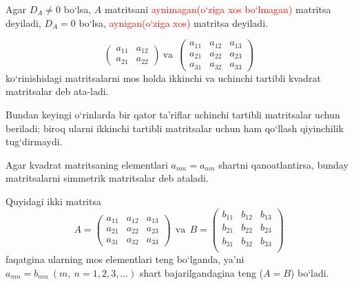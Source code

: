 Agar $D_A\ne0$ bo`lsa, $A$ matritsani \textcolor{red}{aynimagan(o`ziga xos bo`lmagan)} matritsa deyiladi, $D_A=0$ bo`lsa, \textcolor{red}{aynigan(o`ziga xos)} matritsa deyiladi.

$$\begin{pmatrix}
	a_{11}&a_{12}\\
	a_{21}&a_{22}
\end{pmatrix}\ \mbox{va}\ \ \begin{pmatrix}
a_{11}&a_{12}&a_{13}\\
a_{21}&a_{22}&a_{23}\\
a_{31}&a_{32}&a_{33}
\end{pmatrix}$$ ko`rinishidagi matritsalarni mos holda ikkinchi va uchinchi tartibli kvadrat matritsalar deb ata-ladi.

Bundan keyingi o`rinlarda  bir qator ta'riflar uchinchi tartibli matritsalar uchun beriladi; biroq ularni ikkinchi tartibli matritsalar uchun ham qo`llash qiyinchilik tug`dirmaydi.

Agar kvadrat matritsaning elementlari $a_{mn}=a_{nm}$ shartni qanoatlantirsa, bunday matritsalarni simmetrik matritsalar deb ataladi.

Quyidagi ikki matritsa
$$A=\begin{pmatrix}
	a_{11}&a_{12}&a_{13}\\
	a_{21}&a_{22}&a_{23}\\
	a_{31}&a_{32}&a_{33}
\end{pmatrix}\ \ \mbox{va}\ \ B=\begin{pmatrix}
b_{11}&b_{12}&b_{13}\\
b_{21}&b_{22}&b_{23}\\
b_{31}&b_{32}&b_{33}\\
\end{pmatrix}$$
faqatgina ularning mos elementlari teng bo`lganda, ya'ni $a_{mn}=b_{mn}\ (m,\ n=1,2,3,\ldots)$ shart bajarilgandagina teng ($A=B$) bo`ladi.

